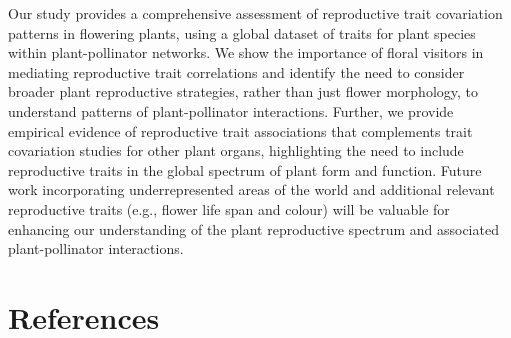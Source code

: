 \documentclass[
  12pt,
  a4paper,
]{article}
\begin{document}
Our study provides a comprehensive assessment of reproductive trait covariation patterns in flowering plants, using a global dataset of traits for plant species within plant-pollinator networks. We show the importance of floral visitors in mediating reproductive trait correlations and identify the need to consider broader plant reproductive strategies, rather than just flower morphology, to understand patterns of plant-pollinator interactions. Further, we provide empirical evidence of reproductive trait associations that complements trait covariation studies for other plant organs, highlighting the need to include reproductive traits in the global spectrum of plant form and function. Future work incorporating underrepresented areas of the world and additional relevant reproductive traits (e.g., flower life span and colour) will be valuable for enhancing our understanding of the plant reproductive spectrum and associated plant-pollinator interactions.

\hypertarget{references}{%
\section{References}\label{references}}
\end{document}
